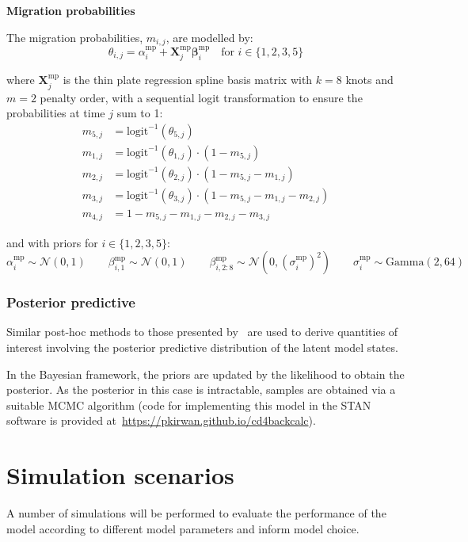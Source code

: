 \documentclass[11pt, a4paper]{article}
\begin{document}
\textbf{Migration probabilities}

The migration probabilities, $m_{i,j}$, are modelled by:
%
\[
\theta_{i,j} = \alpha^{\text{mp}}_i + \mathbf{X}^{\text{mp}}_j \boldsymbol{\beta}^{\text{mp}}_i \quad \text{for } i \in \{1, 2, 3, 5\}
\]

where $\mathbf{X}^{\text{mp}}_j$ is the thin plate regression spline basis matrix with $k=8$ knots and $m=2$ penalty order, with a sequential logit transformation to ensure the probabilities at time $j$ sum to 1:
%
\begin{align*}
m_{5,j} &= \text{logit}^{-1}(\theta_{5,j}) \\
m_{1,j} &= \text{logit}^{-1}(\theta_{1,j}) \cdot (1 - m_{5,j}) \\
m_{2,j} &= \text{logit}^{-1}(\theta_{2,j}) \cdot (1 - m_{5,j} - m_{1,j}) \\
m_{3,j} &= \text{logit}^{-1}(\theta_{3,j}) \cdot (1 - m_{5,j} - m_{1,j} - m_{2,j}) \\
m_{4,j} &= 1 - m_{5,j} - m_{1,j} - m_{2,j} - m_{3,j}
\end{align*}

and with priors for $i \in \{1, 2, 3, 5\}$:
%
\[
\alpha^{\text{mp}}_i \sim \mathcal{N}(0, 1) \quad\quad
\beta^{\text{mp}}_{i, 1} \sim \mathcal{N}(0, 1) \quad\quad
\beta^{\text{mp}}_{i, 2:8} \sim \mathcal{N}(0, (\sigma^{\text{mp}}_i)^2) \quad\quad
\sigma^{\text{mp}}_i \sim \text{Gamma}(2, 64)
\]

\subsubsection{Posterior predictive}

Similar post-hoc methods to those presented by~\cite{birrell_estimating_2012} are used to derive quantities of interest involving the posterior predictive distribution of the latent model states.

In the Bayesian framework, the priors are updated by the likelihood to obtain the posterior. As the posterior in this case is intractable, samples are obtained via a suitable MCMC algorithm (code for implementing this model in the STAN software is provided at~\url{https://pkirwan.github.io/cd4backcalc}).

\section{Simulation scenarios}\label{sec:simulation-scenarios}

A number of simulations will be performed to evaluate the performance of the model according to different model parameters and inform model choice.
\end{document}
